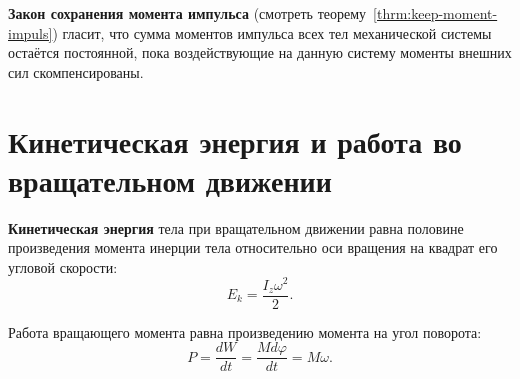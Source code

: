 \documentclass[10pt]{scrbook}
\begin{document}
\textbf{Закон сохранения момента импульса} (смотреть
теорему~\ref{thrm:keep-moment-impuls}) гласит, что сумма моментов импульса всех
тел механической системы остаётся постоянной, пока воздействующие на данную
систему моменты внешних сил скомпенсированы.

\section[девятый вопрос]{Кинетическая энергия и работа во вращательном
  движении}

\textbf{Кинетическая энергия} тела при вращательном движении равна половине
произведения момента инерции тела относительно оси вращения на квадрат его
угловой скорости: \[
	E_k = \frac{I_z \omega^2}{2}
	.\]

Работа вращающего момента равна произведению момента на угол поворота: \[
	P = \frac{dW}{dt} = \frac{M d\varphi}{dt} = M \omega
	.\]
\end{document}
